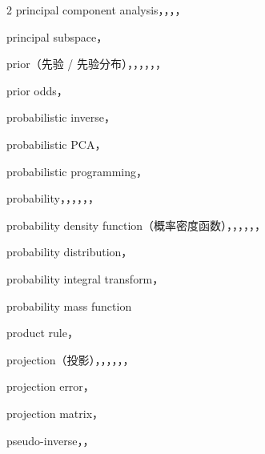 \begin{multicols}{2}
\noindent principal component analysis，，，，\par
\noindent principal subspace，\par
\noindent prior（先验 / 先验分布），，，，，，\par
\noindent prior odds，\par
\noindent probabilistic inverse，\par
\noindent probabilistic PCA，\par
\noindent probabilistic programming，\par
\noindent probability，，，，，，\par
\noindent probability density function（概率密度函数），，，，，，\par
\noindent probability distribution，\par
\noindent probability integral transform，\par
\noindent probability mass function\par
\noindent product rule，\par
\noindent projection（投影），，，，，，\par
\noindent projection error，\par
\noindent projection matrix，\par
\noindent pseudo-inverse，，\par


\end{multicols}
